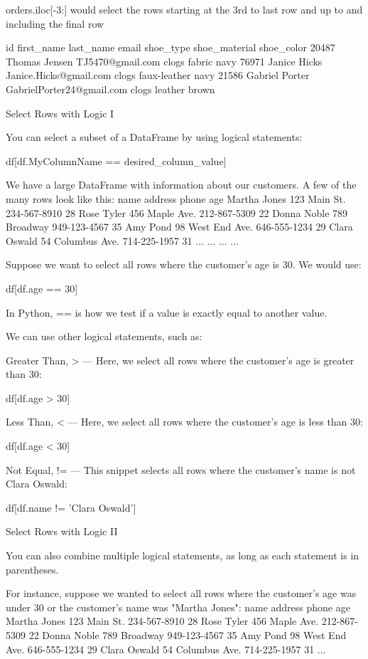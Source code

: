 \documentclass{journal}
\begin{document}
    orders.iloc[-3:] would select the rows starting at the 3rd to last row and up to and including the final row


id 	first_name 	last_name 	email 	shoe_type 	shoe_material 	shoe_color
20487 	Thomas 	Jensen 	TJ5470@gmail.com 	clogs 	fabric 	navy
76971 	Janice 	Hicks 	Janice.Hicks@gmail.com 	clogs 	faux-leather 	navy
21586 	Gabriel 	Porter 	GabrielPorter24@gmail.com 	clogs leather brown

Select Rows with Logic I

You can select a subset of a DataFrame by using logical statements:

df[df.MyColumnName == desired_column_value]

We have a large DataFrame with information about our customers. A few of the many rows look like this:
name 	address 	phone 	age
Martha Jones 	123 Main St. 	234-567-8910 	28
Rose Tyler 	456 Maple Ave. 	212-867-5309 	22
Donna Noble 	789 Broadway 	949-123-4567 	35
Amy Pond 	98 West End Ave. 	646-555-1234 	29
Clara Oswald 	54 Columbus Ave. 	714-225-1957 	31
... 	... 	... 	...

Suppose we want to select all rows where the customer's age is 30. We would use:

df[df.age == 30]

In Python, == is how we test if a value is exactly equal to another value.

We can use other logical statements, such as:

    Greater Than, > — Here, we select all rows where the customer's age is greater than 30:

    df[df.age > 30]

    Less Than, < — Here, we select all rows where the customer's age is less than 30:

    df[df.age < 30]

    Not Equal, != — This snippet selects all rows where the customer's name is not Clara Oswald:

    df[df.name != 'Clara Oswald']


Select Rows with Logic II

You can also combine multiple logical statements, as long as each statement is in parentheses.

For instance, suppose we wanted to select all rows where the customer's age was under 30 or the customer's name was "Martha Jones":
name 	address 	phone 	age
Martha Jones 	123 Main St. 	234-567-8910 	28
Rose Tyler 	456 Maple Ave. 	212-867-5309 	22
Donna Noble 	789 Broadway 	949-123-4567 	35
Amy Pond 	98 West End Ave. 	646-555-1234 	29
Clara Oswald 	54 Columbus Ave. 	714-225-1957 	31
... 			
\end{document}

